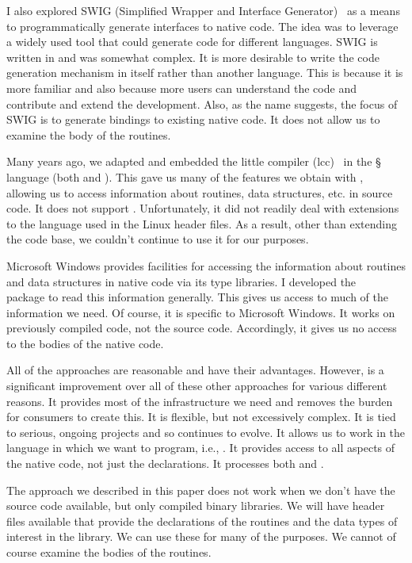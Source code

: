 I also explored SWIG (Simplified Wrapper and Interface
Generator)~\cite{bib:SWIG} as a means to programmatically generate
interfaces to native code. The idea was to leverage a widely used tool
that could generate code for different languages.  SWIG is written in
\perl{} and was somewhat complex. It is more desirable to write the
code generation mechanism in \R{} itself rather than another language.
This is because it is more familiar and also because more users can
understand the code and contribute and extend the development.  Also,
as the name suggests, the focus of SWIG is to generate bindings to
existing native code.  It does not allow us to examine the body of the
routines.


Many years ago, we adapted and embedded the little \C{} compiler
(lcc)~\cite{bib:lcc} in the \S{} language (both \R{} and \Splus).  This gave us many of the
features we obtain with \libclang, allowing us to access information
about routines, data structures, etc. in source code.  It does not
support \Cpp. Unfortunately, it did not readily deal with extensions
to the \C{} language used in the Linux header files. As a result,
other than extending the code base, we couldn't continue to use it for
our purposes.
 
Microsoft Windows provides facilities for accessing the information
about routines and data structures in native code via its type
libraries.  I developed the
~\cite{bib:SWinTypeLibs} package to read this
information generally. This gives us access to much of the information
we need. Of course, it is specific to Microsoft Windows. It works on
previously compiled code, not the source code.  Accordingly, it gives
us no access to the bodies of the native code.



All of the approaches are reasonable and have their
advantages. However, \libclang{} is a significant improvement over all
of these other approaches for various different reasons. It provides
most of the infrastructure we need and removes the burden for
consumers to create this.  It is flexible, but not excessively complex.
It is tied to serious, ongoing projects and so continues to evolve. It
allows us to work in the language in which we want to program,
i.e., \R.  It provides access to all aspects of the native code, not
just the declarations. It processes both \C{} and \Cpp.

The approach we described in this paper does not work when we don't
have the source code available, but only compiled binary libraries. We
will have header files available that provide the declarations of the
routines and the data types of interest in the library.  We can use
these for many of the purposes. We cannot of course examine the bodies
of the routines.

